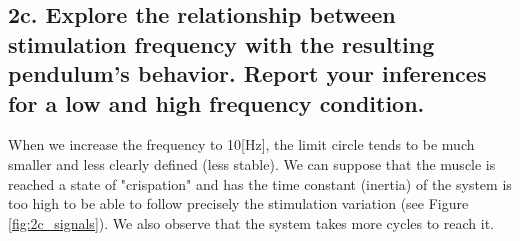 \documentclass{cmc}
\begin{document}


\subsection*{2c. Explore the relationship between stimulation
  frequency with the resulting pendulum's behavior.  Report your
  inferences for a low and high frequency condition.  }
\label{sec:2c}


When we increase the frequency to 10[Hz], the limit circle tends to be much smaller and less clearly defined (less stable). We can suppose that the muscle is reached a state of "crispation" and has the time constant (inertia) of the system is too high to be able to follow precisely the stimulation variation (see Figure \ref{fig:2c_signals}). We also observe that the system takes more cycles to reach it.
\end{document}
